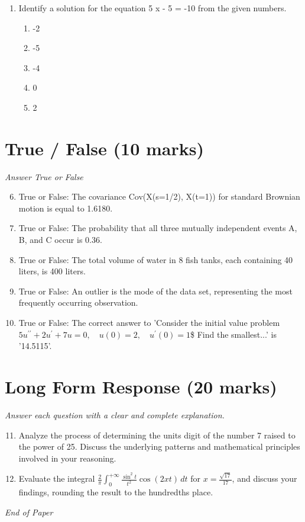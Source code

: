 \documentclass[12pt]{article}
\begin{document}
\begin{enumerate}[label=\arabic*.]
\begin{enumerate}[label=(\alph*)]
    \item 17 over 2
    \item 34 over 4
    \item 16 over 2
    \item 19 over 2
    \item 33 over 4
\end{enumerate}
\item Identify a solution for the equation 5 x - 5 = -10 from the given numbers.
\begin{enumerate}[label=(\alph*)]
    \item -2
    \item -5
    \item -4
    \item 0
    \item 2
\end{enumerate}
\end{enumerate}

\section*{True / False (10 marks)}
\textit{Answer True or False}
\begin{enumerate}[label=\arabic*.]
\setcounter{enumi}{5}
\item True or False: The covariance Cov(X(s=1/2), X(t=1)) for standard Brownian motion is equal to 1.6180.
\item True or False: The probability that all three mutually independent events A, B, and C occur is 0.36.
\item True or False: The total volume of water in 8 fish tanks, each containing 40 liters, is 400 liters.
\item True or False: An outlier is the mode of the data set, representing the most frequently occurring observation.
\item True or False: The correct answer to 'Consider the initial value problem $ 5 u^{\prime \prime}+2 u^{\prime}+7 u=0, \quad u(0)=2, \quad u^{\prime}(0)=1 $\$ Find the smallest...' is '14.5115'.
\end{enumerate}

\section*{Long Form Response (20 marks)}
\textit{Answer each question with a clear and complete explanation.}
\begin{enumerate}[label=\arabic*.]
\setcounter{enumi}{10}
\item Analyze the process of determining the units digit of the number 7 raised to the power of 25. Discuss the underlying patterns and mathematical principles involved in your reasoning.
\item Evaluate the integral \( \frac{2}{\pi} \int_0^{+\infty} \frac{\sin^2 t}{t^2} \cos(2 xt) \, dt \) for \( x = \frac{\sqrt{17}}{17} \), and discuss your findings, rounding the result to the hundredths place.
\end{enumerate}

\vfill
\noindent\textit{End of Paper}
\end{document}

